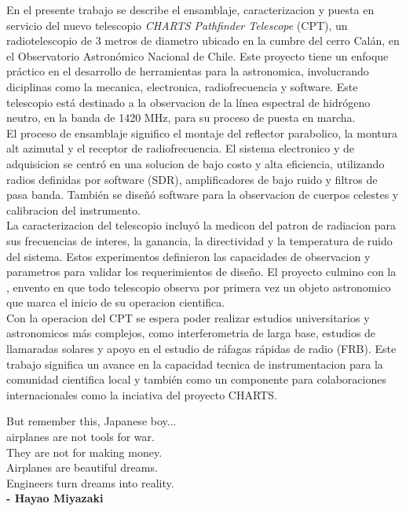 \documentclass[
	spanish, %
	letterpaper, oneside
]{book}
\begin{document}
\templatePortrait

\templatePagecfg

\begin{abstractd}
	En el presente trabajo se describe el ensamblaje, caracterizacion y puesta en servicio del nuevo telescopio \textit{CHARTS Pathfinder Telescope} (CPT), un radiotelescopio de 3 metros de diametro ubicado en la cumbre del cerro Calán, en el Observatorio Astronómico Nacional de Chile. Este proyecto tiene un enfoque práctico en el desarrollo de herramientas para la astronomica, involucrando diciplinas como la mecanica, electronica, radiofrecuencia y software. Este telescopio está destinado a la observacion de la línea espectral de hidrógeno neutro, en la banda de 1420 MHz, para su proceso de puesta en marcha.\\
	
	El proceso de ensamblaje significo el montaje del reflector parabolico, la montura alt azimutal y el receptor de radiofrecuencia. El sistema electronico y de adquisicion se centró en una solucion de bajo costo y alta eficiencia, utilizando radios definidas por software (SDR), amplificadores de bajo ruido y filtros de pasa banda. También se diseñó software para la observacion de cuerpos celestes y calibracion del instrumento.\\

	La caracterizacion del telescopio incluyó la medicon del patron de radiacion para sus frecuencias de interes, la ganancia, la directividad y la temperatura de ruido del sistema. Estos experimentos definieron las capacidades de observacion y parametros para validar los requerimientos de diseño. El proyecto culmino con la , envento en que todo telescopio observa por primera vez un objeto astronomico que marca el inicio de su operacion cientifica.\\

	Con la operacion del CPT se espera poder realizar estudios universitarios y astronomicos más complejos, como interferometria de larga base, estudios de llamaradas solares y apoyo  en el estudio de ráfagas rápidas de radio (FRB). Este trabajo significa un avance en la capacidad tecnica de instrumentacion para la comunidad cientifica local y también como un componente para colaboraciones internacionales como la inciativa del proyecto CHARTS. \\
\end{abstractd}

\begin{dedicatory}
	But remember this, Japanese boy...\\
	airplanes are not tools for war.\\
	They are not for making money.\\ 
	Airplanes are beautiful dreams. \\
	Engineers turn dreams into reality.\\

	\textbf{- Hayao Miyazaki}
\end{dedicatory}
\end{document}
